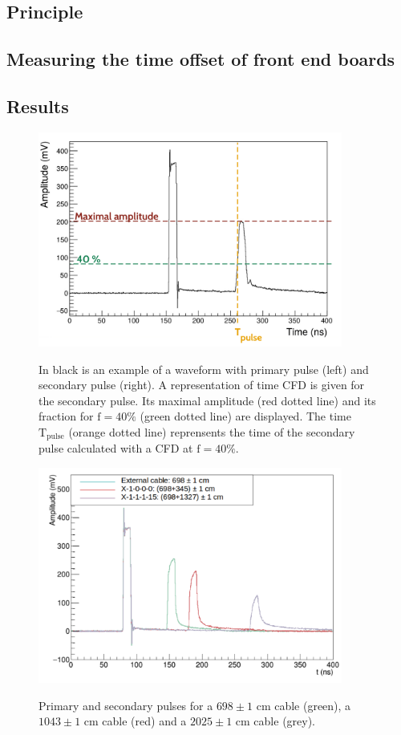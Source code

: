 \subsection{Principle}
\subsection{Measuring the time offset of front end boards}
\subsection{Results}

\begin{figure}
  \centering
  \includegraphics[width=10cm]{commissioning/fig_commissioning/CFD_example.pdf}
  \label{fig:CFD}
  \caption{In black is an example of a waveform with primary pulse (left) and secondary pulse (right).
    A representation of time CFD is given for the secondary pulse.
    Its maximal amplitude (red dotted line) and its fraction for $\text{f}=40\%$ (green dotted line) are displayed.
    The time $\text{T}_{\text{pulse}}$ (orange dotted line) reprensents the time of the secondary pulse calculated with a CFD at $\text{f}=40\%$.}
\end{figure}

\begin{figure}
  \centering
  \includegraphics[width=10cm]{commissioning/fig_commissioning/length_tests.pdf}
  \label{fig:cable_lengths}
  \caption{Primary and secondary pulses for a $698 \pm 1$ cm cable (green), a $1043 \pm 1$ cm cable (red) and a $2025 \pm 1$ cm cable (grey).}
\end{figure}
